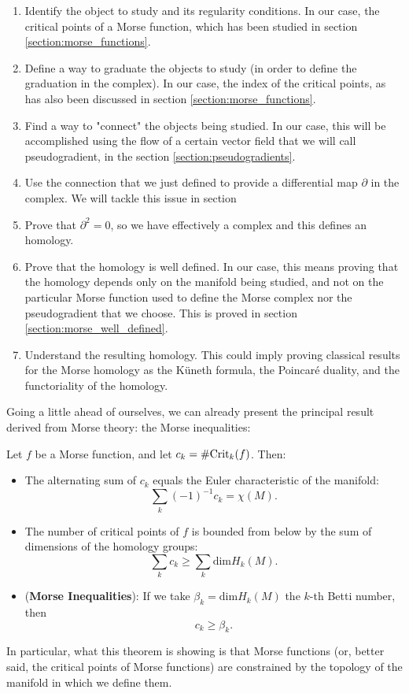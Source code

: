 \begin{enumerate}
\item Identify the object to study and its regularity conditions. In our case, the critical points of a Morse function, which has been studied in section \ref{section:morse_functions}.
\item Define a way to graduate the objects to study (in order to define the graduation in the complex). In our case, the index of the critical points, as has also been discussed in section \ref{section:morse_functions}.
\item Find a way to "connect" the objects being studied. In our case, this will be accomplished using the flow of a certain vector field that we will call pseudogradient, in the section \ref{section:pseudogradients}.
\item Use the connection that we just defined to provide a differential map $\partial$ in the complex. We will tackle this issue in section %
\item Prove that $\partial^2 = 0$, so we have effectively a complex and this defines an homology.
\item Prove that the homology is well defined. In our case, this means proving that the homology depends only on the manifold being studied, and not on the particular Morse function used to define the Morse complex nor the pseudogradient that we choose. This is proved in section \ref{section:morse_well_defined}.
\item Understand the resulting homology. This could imply proving classical results for the Morse homology as the Küneth formula, the Poincaré duality, and the functoriality of the homology.
\end{enumerate}

Going a little ahead of ourselves, we can already present the principal result derived from Morse theory: the Morse inequalities:

\begin{theo} Let $f$ be a Morse function, and let $c_k = \# \text{Crit}_k(f)$. Then:

\begin{itemize}
	\item The alternating sum of $c_k$ equals the Euler characteristic of the manifold:
	$$\sum_k (-1)^{-1}c_k = \chi(M) .$$
	\item The number of critical points of $f$ is bounded from below by the sum of dimensions of the homology groups:
	$$\sum_k c_k \geq \sum_k \text{dim} H_k(M) .$$
	\item ({\bf Morse Inequalities}): If we take $\beta_k = \text{dim} H_k(M)$ the $k$-th Betti number, then
	$$c_k \geq \beta_k .$$
\end{itemize}
\end{theo}

In particular, what this theorem is showing is that Morse functions (or, better said, the critical points of Morse functions) are constrained by the topology of the manifold in which we define them.
